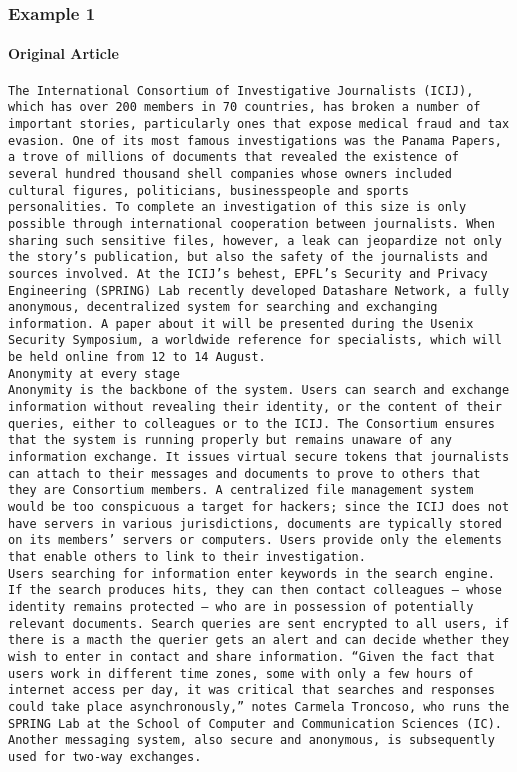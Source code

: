 \subsubsection{Example 1}
\paragraph{\colorbox{YellowOrange}{Original Article}}
\texttt{The International Consortium of Investigative Journalists (ICIJ), which has over 200 members in 70 countries, has broken a number of important stories, particularly ones that expose medical fraud and tax evasion. One of its most famous investigations was the Panama Papers, a trove of millions of documents that revealed the existence of several hundred thousand shell companies whose owners included cultural figures, politicians, businesspeople and sports personalities. To complete an investigation of this size is only possible through international cooperation between journalists. When sharing such sensitive files, however, a leak can jeopardize not only the story’s publication, but also the safety of the journalists and sources involved. At the ICIJ’s behest, EPFL’s Security and Privacy Engineering (SPRING) Lab recently developed Datashare Network, a fully anonymous, decentralized system for searching and exchanging information. A paper about it will be presented during the Usenix Security Symposium, a worldwide reference for specialists, which will be held online from 12 to 14 August. \\
Anonymity at every stage \\
Anonymity is the backbone of the system. Users can search and exchange information without revealing their identity, or the content of their queries, either to colleagues or to the ICIJ. The Consortium ensures that the system is running properly but remains unaware of any information exchange. It issues virtual secure tokens that journalists can attach to their messages and documents to prove to others that they are Consortium members. A centralized file management system would be too conspicuous a target for hackers; since the ICIJ does not have servers in various jurisdictions, documents are typically stored on its members’ servers or computers. Users provide only the elements that enable others to link to their investigation. \\
Users searching for information enter keywords in the search engine. If the search produces hits, they can then contact colleagues – whose identity remains protected – who are in possession of potentially relevant documents. Search queries are sent encrypted to all users, if there is a macth the querier gets an alert and can decide whether they wish to enter in contact and share information. “Given the fact that users work in different time zones, some with only a few hours of internet access per day, it was critical that searches and responses could take place asynchronously,” notes Carmela Troncoso, who runs the SPRING Lab at the School of Computer and Communication Sciences (IC). Another messaging system, also secure and anonymous, is subsequently used for two-way exchanges. \\
}

